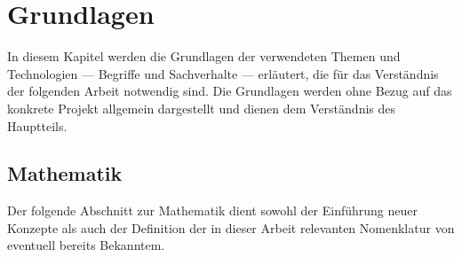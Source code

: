 
\chapter{Grundlagen}
\label{ch:Grundlagen}

In diesem Kapitel werden die Grundlagen der verwendeten Themen und Technologien --- Begriffe und Sachverhalte --- erläutert, die für das Verständnis der folgenden Arbeit notwendig sind.
Die Grundlagen werden ohne Bezug auf das konkrete Projekt allgemein dargestellt und dienen dem Verständnis des Hauptteils.

\section{Mathematik}

Der folgende Abschnitt zur Mathematik dient sowohl der Einführung neuer Konzepte als auch der Definition der in dieser Arbeit relevanten Nomenklatur von eventuell bereits Bekanntem.

